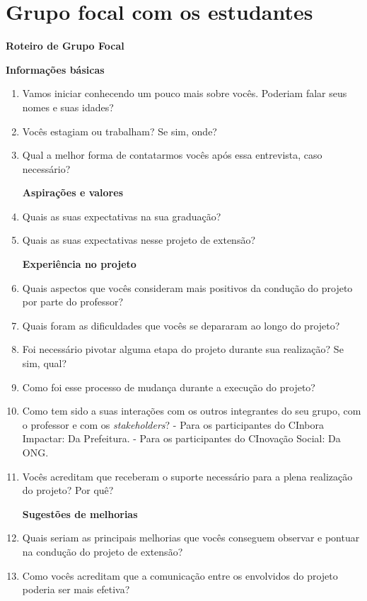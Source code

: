 \chapter{Grupo focal com os estudantes}
\textbf{Roteiro de Grupo Focal}
\par\vspace{1\baselineskip}
\textbf{Informações básicas}
\begin{enumerate}
    \item Vamos iniciar conhecendo um pouco mais sobre vocês. Poderiam falar seus nomes e suas idades?  
    \item Vocês estagiam ou trabalham? Se sim, onde?  
    \item Qual a melhor forma de contatarmos vocês após essa entrevista, caso necessário?  
\par\vspace{1\baselineskip}
\textbf{Aspirações e valores}
    \item Quais as suas expectativas na sua graduação?  
    \item Quais as suas expectativas nesse projeto de extensão?  
\par\vspace{1\baselineskip}
\textbf{Experiência no projeto}
    \item Quais aspectos que vocês consideram mais positivos da condução do projeto por parte do professor?  
    \item Quais foram as dificuldades que vocês se depararam ao longo do projeto?  
    \item Foi necessário pivotar alguma etapa do projeto durante sua realização? Se sim, qual?  
    \item Como foi esse processo de mudança durante a execução do projeto?  
    \item Como tem sido a suas interações com os outros integrantes do seu grupo, com o professor e com os \textit{stakeholders}?
     - Para os participantes do CInbora Impactar: Da Prefeitura.
    - Para os participantes do CInovação Social: Da \gls{ONG}.
    \item Vocês acreditam que receberam o suporte necessário para a plena realização do projeto? Por quê?
\par\vspace{1\baselineskip}
\textbf{Sugestões de melhorias}
    \item Quais seriam as principais melhorias que vocês conseguem observar e pontuar na condução do projeto de extensão?  
    \item Como vocês acreditam que a comunicação entre os envolvidos do projeto poderia ser mais efetiva?  

\end{enumerate}
